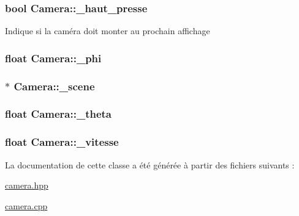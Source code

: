 \hypertarget{class_camera_a43b59b53cb182906d56e6e4d2c31139c}{
\subsubsection[{\+\_\+haut\+\_\+presse}]{\setlength{\rightskip}{0pt plus 5cm}bool Camera\+::\+\_\+haut\+\_\+presse}}\label{class_camera_a43b59b53cb182906d56e6e4d2c31139c}
Indique si la caméra doit monter au prochain affichage \hypertarget{class_camera_a288df53a3ff446ee4367ee47b8499fcd}{
\subsubsection[{\+\_\+phi}]{\setlength{\rightskip}{0pt plus 5cm}float Camera\+::\+\_\+phi\hspace{0.3cm}{\ttfamily [protected]}}}\label{class_camera_a288df53a3ff446ee4367ee47b8499fcd}
\hypertarget{class_camera_a81ffb00eedbaefbfb755b0c13d42180a}{
\subsubsection[{\+\_\+scene}]{$\ast$ Camera\+::\+\_\+scene\hspace{0.3cm}{\ttfamily [protected]}}}\label{class_camera_a81ffb00eedbaefbfb755b0c13d42180a}
\hypertarget{class_camera_aeb3c859c3c254c8296420451259e5629}{
\subsubsection[{\+\_\+theta}]{\setlength{\rightskip}{0pt plus 5cm}float Camera\+::\+\_\+theta\hspace{0.3cm}{\ttfamily [protected]}}}\label{class_camera_aeb3c859c3c254c8296420451259e5629}
\hypertarget{class_camera_a9062fdde515a49bf8db963ac46be9942}{
\subsubsection[{\+\_\+vitesse}]{\setlength{\rightskip}{0pt plus 5cm}float Camera\+::\+\_\+vitesse\hspace{0.3cm}{\ttfamily [protected]}}}\label{class_camera_a9062fdde515a49bf8db963ac46be9942}


La documentation de cette classe a été générée à partir des fichiers suivants \+:\begin{DoxyCompactItemize}
\item 
\hyperlink{camera_8hpp}{camera.\+hpp}\item 
\hyperlink{camera_8cpp}{camera.\+cpp}\end{DoxyCompactItemize}
